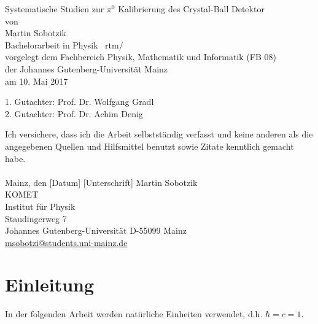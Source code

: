 \documentclass[a4paper,11pt,oneside,final,german,openbib,pdftex]{scrbook}
\begin{document}

\begin{titlepage}
  \vspace*{6mm}
  \begin{center}
     {\afont Systematische Studien zur $\pi^0$ Kalibrierung des Crystal-Ball Detektor}
     \\[3.5cm]
     {\large von}
     \\[3.5cm]
     {\dfont Martin Sobotzik}
     \\[2cm]
     {\large Bachelorarbeit in Physik \ rtm/\\
        vorgelegt dem Fachbereich Physik, Mathematik und Informatik (FB 08) \/\\
        der Johannes Gutenberg-Universit\"at Mainz \/\\
        am 10. Mai 2017}
   \end{center}
   \vfill
   1. Gutachter: Prof. Dr. Wolfgang Gradl\\	
   2. Gutachter: Prof. Dr. Achim Denig \\
   \vfill
\end{titlepage}

\thispagestyle{empty}
Ich versichere, dass ich die Arbeit selbstst\"andig verfasst und keine 
anderen als die angegebenen Quellen und Hilfsmittel benutzt sowie 
Zitate kenntlich gemacht habe.
\\
\\[3.5cm] 
Mainz, den [Datum] [Unterschrift]
\vfill
\noindent 
Martin Sobotzik\\
KOMET\\
Institut f\"ur Physik\\
Staudingerweg 7\\
Johannes Gutenberg-Universit\"at
D-55099 Mainz\\
{\url{ msobotzi@students.uni-mainz.de}}

\renewcommand\contentsname{Inhaltsverzeichnis}
\renewcommand\figurename{Abbildung}
\renewcommand\tablename{Tabelle}
\tableofcontents
\clearpage

\mainmatter
\sloppy

\chapter{Einleitung}
In der folgenden Arbeit werden natürliche Einheiten verwendet, d.h. $\hbar=c=1$.
\end{document}
